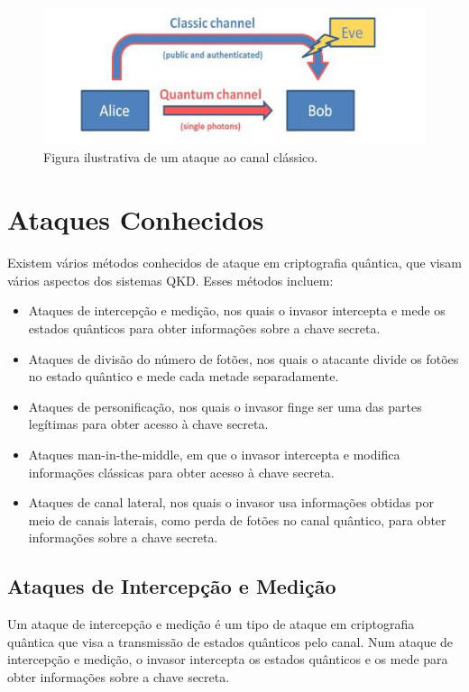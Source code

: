 \begin{figure}[!hbt]
  \centering
  \includegraphics[width=\textwidth]{images/possible-attack.jpg}
  \caption{Figura ilustrativa de um ataque ao canal clássico.}
  \label{fig:classic-attack}
\end{figure}
\FloatBarrier

\section{Ataques Conhecidos}

Existem vários métodos conhecidos de ataque em criptografia quântica, que visam vários aspectos dos sistemas QKD. Esses métodos incluem:

\begin{itemize}
  \item Ataques de intercepção e medição, nos quais o invasor intercepta e mede os estados quânticos para obter informações sobre a chave secreta.
  \item Ataques de divisão do número de fotões, nos quais o atacante divide os fotões no estado quântico e mede cada metade separadamente.
  \item Ataques de personificação, nos quais o invasor finge ser uma das partes legítimas para obter acesso à chave secreta.
  \item Ataques man-in-the-middle, em que o invasor intercepta e modifica informações clássicas para obter acesso à chave secreta.
  \item Ataques de canal lateral, nos quais o invasor usa informações obtidas por meio de canais laterais, como perda de fotões no canal quântico, para obter informações sobre a chave secreta.
\end{itemize}

\subsection{Ataques de Intercepção e Medição}

Um ataque de intercepção e medição é um tipo de ataque em criptografia quântica que visa a transmissão de estados quânticos pelo canal. Num ataque de intercepção e medição, o invasor intercepta os estados quânticos e os mede para obter informações sobre a chave secreta.


